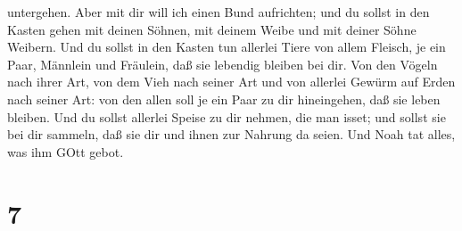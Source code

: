 untergehen.  Aber mit dir will ich einen Bund aufrichten;
und du sollst in den Kasten gehen mit deinen Söhnen, mit deinem Weibe
und mit deiner Söhne Weibern.  Und du sollst in den Kasten
tun allerlei Tiere von allem Fleisch, je ein Paar, Männlein und
Fräulein, daß sie lebendig bleiben bei dir.  Von den Vögeln
nach ihrer Art, von dem Vieh nach seiner Art und von allerlei Gewürm auf
Erden nach seiner Art: von den allen soll je ein Paar zu dir
hineingehen, daß sie leben bleiben.  Und du sollst allerlei
Speise zu dir nehmen, die man isset; und sollst sie bei dir sammeln, daß
sie dir und ihnen zur Nahrung da seien.  Und Noah tat
alles, was ihm GOtt gebot.

\hypertarget{section-6}{%
\section{7}\label{section-6}}

